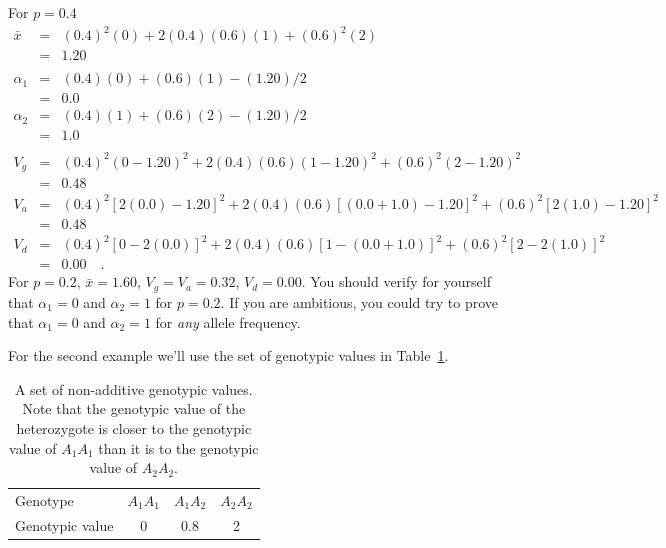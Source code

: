 For $p = 0.4$
\begin{eqnarray*}
{\bar x} &=& (0.4)^2(0) + 2(0.4)(0.6)(1) + (0.6)^2(2) \\
                    &=& 1.20 \\
\\
\alpha_1 &=& (0.4)(0) + (0.6)(1) - (1.20)/2 \\
         &=& 0.0 \\
\alpha_2 &=& (0.4)(1) + (0.6)(2) - (1.20)/2 \\
         &=& 1.0 \\
\\
V_g &=& (0.4)^2(0-1.20)^2 + 2(0.4)(0.6)(1-1.20)^2 + (0.6)^2(2-1.20)^2 \\
    &=& 0.48 \\
V_a &=& (0.4)^2[2(0.0)-1.20]^2 + 2(0.4)(0.6)[(0.0+1.0)-1.20]^2
       + (0.6)^2[2(1.0)-1.20]^2 \\
    &=& 0.48 \\
V_d &=& (0.4)^2[0 - 2(0.0)]^2 + 2(0.4)(0.6)[1 - (0.0+1.0)]^2
       + (0.6)^2[2 - 2(1.0)]^2 \\
    &=& 0.00 \quad . 
\end{eqnarray*}
For $p = 0.2$, ${\bar x} = 1.60$, $V_g = V_a = 0.32$, $V_d = 0.00$. 
You should verify for yourself that $\alpha_1=0$ and $\alpha_2=1$ for
$p=0.2$.  If you are ambitious, you could try to prove that
$\alpha_1=0$ and $\alpha_2=1$ for {\it any\/} allele frequency.

For the second example we'll use the set of genotypic values in
Table~\ref{table:non-additive}.

\begin{table}
\begin{center}
\begin{tabular}{l|ccc}
\hline\hline
Genotype        & $A_1A_1$ & $A_1A_2$ & $A_2A_2$ \\
Genotypic value & 0        & 0.8      & 2 \\
\hline
\end{tabular}
\end{center}
\caption{A set of non-additive genotypic values. Note that the
  genotypic value of the heterozygote is closer to the genotypic value
  of $A_1A_1$ than it is to the genotypic value of $A_2A_2$.}\label{table:non-additive}
\end{table}

